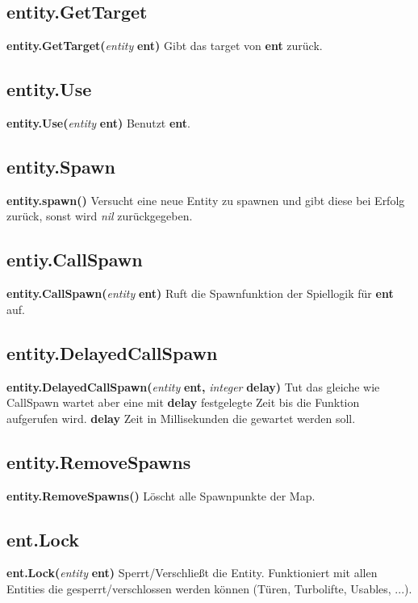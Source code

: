 \documentclass[11pt,a4paper]{book}
\begin{document}
\subsection{entity.GetTarget}
\label{enty-gettarget}
\textbf{entity.GetTarget(}\textit{entity}\textbf{ ent)}
Gibt das target von \textbf{ent} zurück.
\subsection{entity.Use}
\label{enty-use}
\textbf{entity.Use(}\textit{entity}\textbf{ ent)}
\newline
Benutzt \textbf{ent}.
\subsection{entity.Spawn}
\label{enty-spawn}
\textbf{entity.spawn()}
\newline
Versucht eine neue Entity zu spawnen und gibt diese bei Erfolg zurück, sonst wird \textit{nil} zurückgegeben.
\subsection{entiy.CallSpawn}
\label{enty-callspawn}
\textbf{entity.CallSpawn(}\textit{entity}\textbf{ ent)}
\newline
Ruft die Spawnfunktion der Spiellogik für \textbf{ent} auf.
\subsection{entity.DelayedCallSpawn}
\label{enty-delayedcallspawn}
\textbf{entity.DelayedCallSpawn(}\textit{entity}\textbf{ ent, }\textit{integer}\textbf{ delay)}
\newline
Tut das gleiche wie CallSpawn wartet aber eine mit \textbf{delay} festgelegte Zeit bis die Funktion aufgerufen wird.
\textbf{delay} Zeit in Millisekunden die gewartet werden soll.
\subsection{entity.RemoveSpawns}
\label{enty-removespawns}
\textbf{entity.RemoveSpawns()}
\newline
Löscht alle Spawnpunkte der Map.
\subsection{ent.Lock}
\label{enty-lock}
\textbf{ent.Lock(}\textit{entity}\textbf{ ent)}
\newline
Sperrt/Verschließt die  Entity. Funktioniert mit allen Entities die gesperrt/verschlossen werden können (Türen, Turbolifte, Usables, ...).
\end{document}
